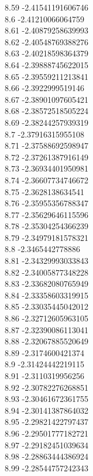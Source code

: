 {8.59	-2.41541191606746\\
8.6	-2.41210066064759\\
8.61	-2.40879258639993\\
8.62	-2.40548769388276\\
8.63	-2.40218598364379\\
8.64	-2.39888745622015\\
8.65	-2.39559211213841\\
8.66	-2.3922999519146\\
8.67	-2.38901097605421\\
8.68	-2.38572518505224\\
8.69	-2.38244257939319\\
8.7	-2.37916315955108\\
8.71	-2.37588692598947\\
8.72	-2.37261387916149\\
8.73	-2.36934401950981\\
8.74	-2.36607734746672\\
8.75	-2.3628138634541\\
8.76	-2.35955356788347\\
8.77	-2.35629646115596\\
8.78	-2.35304254366239\\
8.79	-2.34979181578321\\
8.8	-2.3465442778886\\
8.81	-2.34329993033843\\
8.82	-2.34005877348228\\
8.83	-2.33682080765949\\
8.84	-2.33358603319915\\
8.85	-2.33035445042012\\
8.86	-2.32712605963105\\
8.87	-2.32390086113041\\
8.88	-2.32067885520649\\
8.89	-2.3174600421374\\
8.9	-2.31424442219115\\
8.91	-2.3110319956256\\
8.92	-2.30782276268851\\
8.93	-2.30461672361755\\
8.94	-2.30141387864032\\
8.95	-2.29821422797437\\
8.96	-2.29501777182721\\
8.97	-2.29182451039634\\
8.98	-2.28863444386924\\
8.99	-2.28544757242343\\
}

